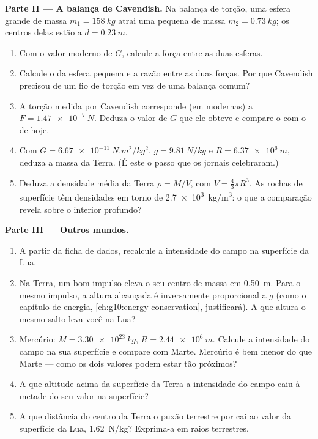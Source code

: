 \begin{problem}
\medskip
\noindent\textbf{Parte II --- A balança de Cavendish.}
Na balança de torção, uma esfera grande de massa $m_1 = \qty{158}{kg}$
atrai uma pequena de massa $m_2 = \qty{0.73}{kg}$; os centros delas estão
a $d = \qty{0.23}{m}$.
\begin{enumerate}[resume]
  \item Com o valor moderno de $G$, calcule a força entre as duas
        esferas.
  \item Calcule o  da esfera pequena e a razão entre as duas forças.
        Por que Cavendish precisou de um fio de torção em vez de uma
        balança comum?
  \item A torção medida por Cavendish corresponde (em  modernas)
        a $F = \qty{1.47e-7}{N}$. Deduza o valor de $G$ que ele obteve e
        compare-o com o de hoje.
  \item Com $G = \qty{6.67e-11}{N.m^2/kg^2}$, $g = \qty{9.81}{N/kg}$ e
        $R = \qty{6.37e6}{m}$, deduza a massa da Terra. (É este o passo
        que os jornais celebraram.)
  \item Deduza a densidade média da Terra $\rho = M / V$, com
        $V = \frac43 \pi R^3$. As rochas de superfície têm densidades em
        torno de \qty{2.7e3}{kg/m^3}: o que a comparação revela sobre o
        interior profundo?
\end{enumerate}

\medskip
\noindent\textbf{Parte III --- Outros mundos.}
\begin{enumerate}[resume]
  \item A partir da ficha de dados, recalcule a intensidade do campo na
        superfície da Lua.
  \item Na Terra, um bom impulso eleva o seu centro de massa em
        \qty{0.50}{m}. Para o mesmo impulso, a altura alcançada é
        inversamente proporcional a $g$ (como o capítulo de energia,
        \cref{ch:g10:energy-conservation}, justificará). A que altura o
        mesmo salto leva você na Lua?
  \item Mercúrio: $M = \qty{3.30e23}{kg}$, $R = \qty{2.44e6}{m}$. Calcule
        a intensidade do campo na sua superfície e compare com Marte.
        Mercúrio é bem menor do que Marte --- como os dois valores podem
        estar tão próximos?
  \item A que altitude acima da superfície da Terra a intensidade do
        campo caiu à metade do seu valor na superfície?
  \item A que distância do centro da Terra o puxão terrestre por
         cai ao valor da superfície da Lua, \qty{1.62}{N/kg}?
        Exprima-a em raios terrestres.
\end{enumerate}


\end{problem}
